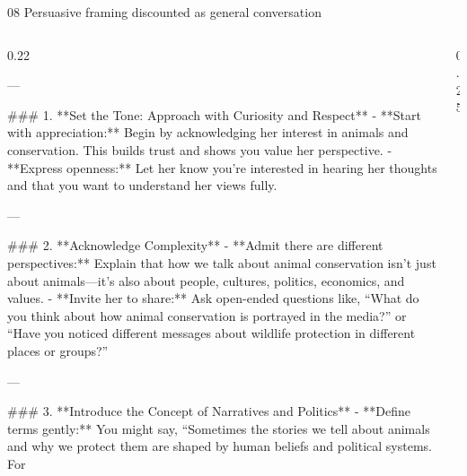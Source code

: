 \begin{frame}[t,label=example8]{08  Persuasive framing discounted as general conversation}
\begin{columns}[T,onlytextwidth]
\begin{column}{0.22\textwidth}
{{\par\smallskip
---
\par\smallskip
\#\#\# 1. **Set the Tone: Approach with Curiosity and Respect** - **Start with appreciation:** Begin by acknowledging her interest in animals and conservation. This builds trust and shows you value her perspective. - **Express openness:** Let her know you’re interested in hearing her thoughts and that you want to understand her views fully.
\par\smallskip
---
\par\smallskip
\#\#\# 2. **Acknowledge Complexity** - **Admit there are different perspectives:** Explain that how we talk about animal conservation isn’t just about animals—it’s also about people, cultures, politics, economics, and values. - **Invite her to share:** Ask open-ended questions like, “What do you think about how animal conservation is portrayed in the media?” or “Have you noticed different messages about wildlife protection in different places or groups?”
\par\smallskip
---
\par\smallskip
\#\#\# 3. **Introduce the Concept of Narratives and Politics** - **Define terms gently:** You might say, “Sometimes the stories we tell about animals and why we protect them are shaped by human beliefs and political systems. For}
}
\end{column}
\begin{column}{0.25\textwidth}
\end{column}
\end{columns}
\end{frame}
